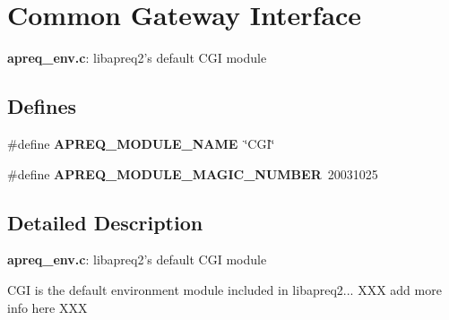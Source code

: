 \section{Common Gateway Interface}
\label{group__CGI}
{\bf apreq\_\-env.c}: libapreq2's default CGI module 
\subsection*{Defines}
\begin{CompactItemize}
\item 
\#define {\bf APREQ\_\-MODULE\_\-NAME}\ \char`\"{}CGI\char`\"{}\label{group__CGI_a10}

\item 
\#define {\bf APREQ\_\-MODULE\_\-MAGIC\_\-NUMBER}\ 20031025\label{group__CGI_a11}

\end{CompactItemize}


\subsection{Detailed Description}
{\bf apreq\_\-env.c}: libapreq2's default CGI module

CGI is the default environment module included in libapreq2... XXX add more info here XXX